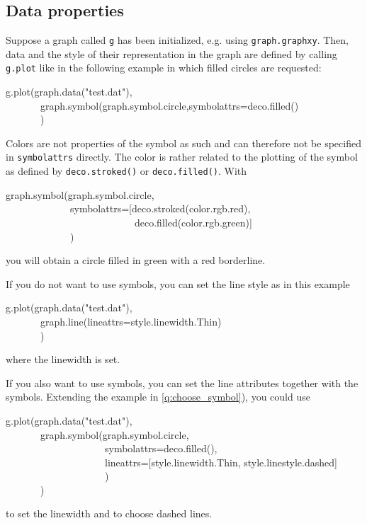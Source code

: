 \documentclass[11pt,DIV14]{scrartcl}
\begin{document}
\subsection{Data properties}

{}
{\label{q:choose_symbol}
Suppose a graph called \texttt{g} has been initialized, e.g. using
\texttt{graph.graphxy}. Then, data and the style of their representation
in the graph are defined by calling \texttt{g.plot} like in the following
example in which filled circles are requested:
\begin{progcode}
g.plot(graph.data("test.dat"),\\
~~~~~~~graph.symbol(graph.symbol.circle,symbolattrs=deco.filled()\\
~~~~~~~)
\end{progcode}
}

{}
{Colors are not properties of the symbol as such and can therefore not
be specified in \texttt{symbolattrs} directly. The color is rather related
to the plotting of the symbol as defined by \texttt{deco.stroked()} or
\texttt{deco.filled()}. With
\begin{progcode}
graph.symbol(graph.symbol.circle,\\
~~~~~~~~~~~~~symbolattrs=[deco.stroked(color.rgb.red),\\
~~~~~~~~~~~~~~~~~~~~~~~~~~deco.filled(color.rgb.green)]\\
~~~~~~~~~~~~~)
\end{progcode}
you will obtain a circle filled in green with a red borderline.
}

{}
{If you do not want to use symbols, you can set the line style as in this
example
\begin{progcode}
g.plot(graph.data("test.dat"),\\
~~~~~~~graph.line(lineattrs=style.linewidth.Thin)\\
~~~~~~~)
\end{progcode}
where the linewidth is set.

If you also want to use symbols, you can set the line attributes together
with the symbols.  Extending the example in \ref{q:choose_symbol}),
you could use
\begin{progcode}
g.plot(graph.data("test.dat"),\\
~~~~~~~graph.symbol(graph.symbol.circle, \\
~~~~~~~~~~~~~~~~~~~~symbolattrs=deco.filled(),\\
~~~~~~~~~~~~~~~~~~~~lineattrs=[style.linewidth.Thin, style.linestyle.dashed]\\
~~~~~~~~~~~~~~~~~~~~)\\
~~~~~~~)
\end{progcode}
to set the linewidth and to choose dashed lines. 
}
\end{document}
